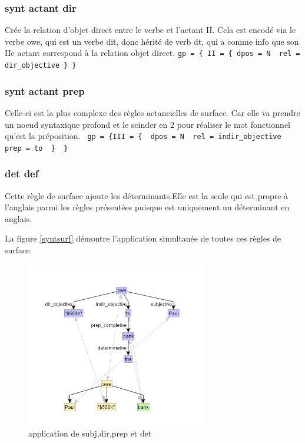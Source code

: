 \subsubsection{synt actant dir}
Crée la relation d'objet direct entre le verbe et l'actant II. Cela est encodé via le verbe owe, qui est un verbe dit, donc hérité de verb dt, qui a comme info que son IIe actant correspond à la relation objet direct.  \lstinline!gp = { II = { dpos = N  rel = dir_objective } }!

\subsubsection{synt actant prep}
Celle-ci est la plus complexe des règles actancielles de surface. Car elle va prendre un noeud syntaxique profond et le scinder en 2 pour réaliser le mot fonctionnel qu'est la préposition.  \lstinline! gp = {III = {  dpos = N  rel = indir_objective  prep = to  }  }!

\subsubsection{det def}

Cette règle de surface ajoute les déterminants.Elle est la seule qui est propre à l'anglais parmi les règles présentées puisque  est uniquement un déterminant en anglais.

La figure \ref{syntsurf} démontre l'application simultanée de toutes ces règles de surface.

\begin{figure}[htb]
	\centering
	\includegraphics[width=0.7\textwidth, trim = {0cm 0cm 0cm 0cm},clip]{ch3/figs/rsynts_syntactisation.png}
	\caption{application de subj,dir,prep et det}
	\label{fig:syntsurf}
\end{figure}


